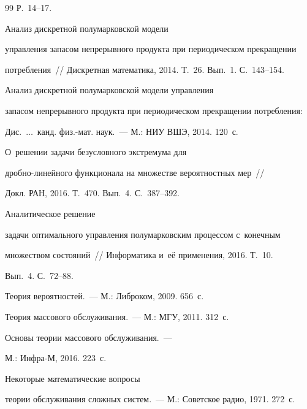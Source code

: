 {{\begin{thebibliography}{99}
Р.~14--17.


 Анализ дискретной полумарковской модели 

управ\-ле\-ния запасом непрерывного продукта при периодическом прекращении 

потребления~/\!\!/ Дискретная математика, 2014. Т.~26. Вып.~1. С.~143--154.


 Анализ дискретной полумарковской модели управления 

запасом непрерывного продукта при периодическом прекращении потребления: 

Дис.\ $\ldots$\ канд. физ.-мат. наук.~--- М.: НИУ ВШЭ, 2014. 120~с.




 О~решении задачи безусловного экстремума для  

дроб\-но-ли\-ней\-но\-го функционала на множестве вероятностных мер~/\!\!/ 

Докл. РАН, 2016. Т.~470. Вып.~4. С.~387--392.


 Аналитическое решение 

задачи оптимального управления полумарковским процессом с~конечным 

множеством состояний~/\!\!/ Информатика и~её применения, 2016. Т.~10. 

Вып.~4. С.~72--88.


 Теория вероятностей.~--- М.: Либроком, 2009. 656~с.


 Теория массового обслуживания.~--- М.: МГУ, 2011. 312~с.


 Основы теории массового обслуживания.~--- 

М.: Инфра-М, 2016. 223~с.


 Некоторые математические вопросы 

теории обслуживания сложных сис\-тем.~--- М.: Советское радио, 1971. 272~с.


\end{thebibliography}}}
